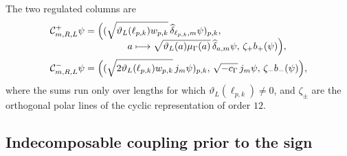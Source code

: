 The two regulated columns are
\begin{align}
 \mathcal C^+_{m,R,L}\psi
 ={}&
 \Bigl(
  (\sqrt{\vartheta_L(\ell_{p,k})w_{p,k}}\,
       \widehat\delta_{\ell_{p,k},m}\psi)_{p,k},
 \nonumber\\[-2mm]
 &\hspace{11mm}
  a\longmapsto
  \sqrt{\vartheta_L(a)\mu_\Gamma(a)}\,
       \widehat\delta_{a,m}\psi,\,
  \zeta_+b_+(\psi)
 \Bigr),                                             \label{eq:amp-rh-columna-mas-explicita}\\
 \mathcal C^-_{m,R,L}\psi
 ={}&
 \Bigl(
  (\sqrt{2\vartheta_L(\ell_{p,k})w_{p,k}}\,j_m\psi)_{p,k},\,
  \sqrt{-c_\Gamma}\,j_m\psi,\,
  \zeta_-b_-(\psi)
 \Bigr),                                             \label{eq:amp-rh-columna-menos-explicita}
\end{align}
where the sums run only over lengths for which \(\vartheta_L(\ell_{p,k})\neq0\), and \(\zeta_\pm\) are the orthogonal polar lines of the cyclic representation of order \(12\).

\subsection*{Indecomposable coupling prior to the sign}

